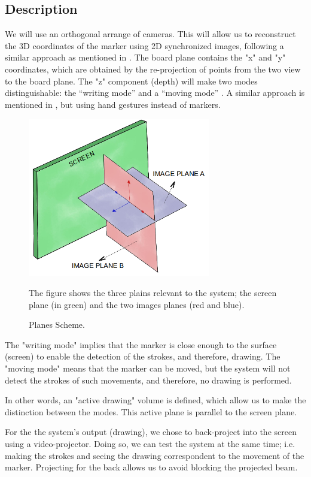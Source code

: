 \documentclass[a4paper,12pt]{article}
\begin{document}
\subsection*{Description}
We will use an orthogonal arrange of cameras. This will allow us to reconstruct the 3D coordinates of the marker using 2D synchronized images, following a similar approach as mentioned in \cite{laganiere}. The board plane contains the "x" and "y" coordinates, which are obtained by the re-projection of points from the two view to the board plane. The "z" component (depth) will make two modes distinguishable: the “writing mode” and a “moving mode” . A similar approach is mentioned in \cite{zabulis}, but using hand gestures instead of markers.

\begin{figure}[H]
    \begin{center}
    \includegraphics[width=8cm]{planesScheme.png}
    \caption{Planes Scheme.}
    The figure shows the three plains relevant to the system; the screen plane (in green) and  the two images planes (red and blue).
	\label{fig:planes}
    \end{center}
\end{figure}

The "writing mode" implies that the marker is close enough to the surface (screen) to enable the detection of the strokes, and therefore, drawing. The "moving mode" means that the marker can be moved, but the system will not detect the strokes of such movements, and therefore, no drawing is performed.

In other words, an "active drawing" volume is defined, which allow us to make the distinction between the modes. This active plane is parallel to the screen plane.

For the the system's output (drawing), we chose to back-project into the screen using a video-projector. Doing so, we can test the system at the same time; i.e. making the strokes and seeing the drawing correspondent to the movement of the marker. Projecting for the back allows us to avoid blocking the projected beam.
\end{document}
